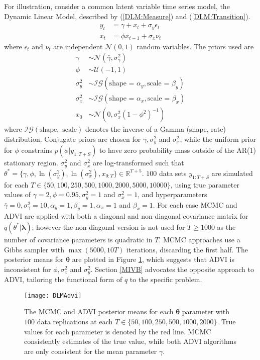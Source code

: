 \documentclass[12pt,a4paper]{article}%
\numberwithin{equation}{section}
\begin{document}
For illustration, consider a common latent variable time series model, the Dynamic Linear Model, described by (\ref{DLM:Measure}) and (\ref{DLM:Transition}).
\begin{align}
y_t &= \gamma + x_t + \sigma_y \epsilon_t \label{DLM:Measure}\\
x_t &= \phi x_{t-1} + \sigma_x \nu_t \label{DLM:Transition}
\end{align}
where $\epsilon_t$ and $\nu_t$ are independent $\mathcal{N}(0, 1)$ random variables. The priors used are
\begin{align}
\gamma &\sim \mathcal{N}(\bar{\gamma}, \sigma^2_{\gamma}) \\
\phi &\sim \mathcal{U}(-1, 1) \\
\sigma^2_y &\sim \mathcal{IG}(\mbox{shape = }\alpha_y, \mbox{scale = }\beta_y) \\
\sigma^2_x &\sim \mathcal{IG}(\mbox{shape = }\alpha_x, \mbox{scale = }\beta_x) \\
x_0 &\sim \mathcal{N}(0, \sigma^2_x(1 - \phi^2)^{-1})
\end{align}
where $\mathcal{IG}(\mbox{shape}, \mbox{ scale})$ denotes the inverse of a Gamma (shape, rate) distribution. Conjugate priors are chosen for $\gamma, \sigma^2_y$ and $\sigma^2_x$, while the uniform prior for $\phi$ constrains $p(\phi | y_{1:T+S})$ to have zero probability mass outside of the AR(1) stationary region. $\sigma^2_y$ and $\sigma^2_x$ are log-transformed such that $\theta^* = \{\gamma, \phi, \ln(\sigma^2_y), \ln(\sigma^2_x), x_{0:T}\} \in \mathbb{R}^{T+5}$. $100$ data sets $y_{1:T+S}$ are simulated for each $T \in \{50, 100, 250, 500, 1000, 2000, 5000, 10000\}$, using true parameter values of $\gamma = 2, \phi = 0.95, \sigma^2_y = 1$ and $\sigma^2_x=1$, and hyperparameters $\bar{\gamma} = 0, \sigma^2_{\gamma} = 10, \alpha_y = 1, \beta_y = 1, \alpha_x = 1$ and $\beta_x = 1$. For each case MCMC and ADVI are applied with both a diagonal and non-diagonal covariance matrix for $q(\theta^* | \boldsymbol{\lambda})$; however the non-diagonal version is not used for $T \geq 1000$ as the number of covariance parameters is quadratic in $T$. MCMC approaches use a Gibbs sampler with $\max(5000, 10T)$ iterations, discarding the first half. The posterior means for $\boldsymbol{\theta}$ are plotted in Figure \ref{fig:DLM:ADVI}, which suggests that ADVI is inconsistent for $\phi, \sigma^2_x$ and $\sigma^2_y$. Section \ref{MIVB} advocates the opposite approach to ADVI, tailoring the functional form of $q$ to the specific problem.

\begin{figure}[h]
\texttt{[image: DLMAdvi]}
\caption{The MCMC and ADVI posterior means for each $\boldsymbol{\theta}$ parameter with $100$ data replications at each $T \in \{50, 100, 250, 500, 1000, 2000\}$. True values for each parameter is denoted by the red line. MCMC consistently estimates of the true value, while both ADVI algorithms are only consistent for the mean parameter $\gamma$.}
\label{fig:DLM:ADVI}
\end{figure}
\end{document}
